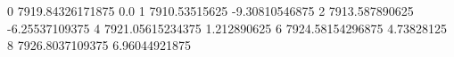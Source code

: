 0 7919.84326171875 0.0
1 7910.53515625 -9.30810546875
2 7913.587890625 -6.25537109375
4 7921.05615234375 1.212890625
6 7924.58154296875 4.73828125
8 7926.8037109375 6.96044921875
